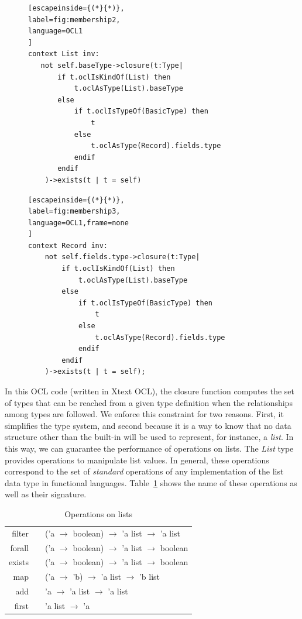 \begin{figure}
\begin{minipage}[b]{0.44\linewidth}

\begin{lstlisting}[escapeinside={(*}{*)},
label=fig:membership2,
language=OCL1
]
context List inv:
   not self.baseType->closure(t:Type| 
	   if t.oclIsKindOf(List) then
		   t.oclAsType(List).baseType
	   else
		   if t.oclIsTypeOf(BasicType) then
			   t
		   else
			   t.oclAsType(Record).fields.type
		   endif
	   endif
   	)->exists(t | t = self)
\end{lstlisting} 
\end{minipage}
\hspace{0.1\linewidth}
\begin{minipage}[b]{0.44\linewidth}
\begin{lstlisting}[escapeinside={(*}{*)},
label=fig:membership3,
language=OCL1,frame=none
]
context Record inv: 
	not self.fields.type->closure(t:Type|
		if t.oclIsKindOf(List) then
			t.oclAsType(List).baseType
		else
			if t.oclIsTypeOf(BasicType) then
				t
			else
				t.oclAsType(Record).fields.type
			endif
		endif
	)->exists(t | t = self);
\end{lstlisting} 
\end{minipage}
\end{figure}

In this OCL code (written in Xtext OCL), the closure function computes the set of types that can be reached from a given type definition when the relationships among types are followed.
We enforce this constraint for two reasons. First, it simplifies the type system, and second because it is a way to know that no data structure other than the built-in will be used to represent, for instance, a \textit{list}.
In this way, we can guarantee the performance of operations on lists.  
The \textit{List} type provides operations to manipulate list values.
In general, these operations correspond to the set of \textit{standard} operations of any implementation of the list data type in functional languages.
Table~\ref{tab:operations-on-lists} shows the name of these operations as well as their signature.

\begin{table}[!ht]
\centering
\begin{tabular}{r p{0.5cm} l}
\hline
\hline filter & & ('a $\to$ boolean) $\to$ 'a list $\to$ 'a list \\ 
forall & & ('a $\to$ boolean) $\to$ 'a list $\to$ boolean \\ 
exists & & ('a $\to$ boolean) $\to$ 'a list $\to$ boolean \\ 
map & & ('a $\to$ 'b) $\to$ 'a list $\to$ 'b list \\ 
add & & 'a $\to$ 'a list $\to$ 'a list \\ 
first & & 'a list $\to$ 'a \\
\hline 
\end{tabular} 
\caption{Operations on lists} \label{tab:operations-on-lists}
\end{table} 

